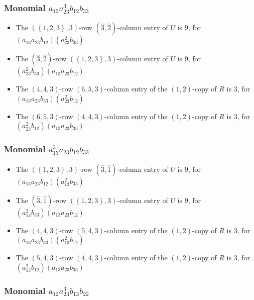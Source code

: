 \documentclass{article}
\begin{document}
\subsubsection{Monomial $ a_{13} a_{23}^{3} b_{12} b_{33} $}

\begin{itemize}
\item The $ \left(\left\{1, 2, 3\right\}, 3\right) $-row $ (\hat{3}, \hat{2}) $-column entry of $U$ is $ 9 $, for $( a_{13} a_{23} b_{12} )( a_{23}^{2} b_{33} )$ 
\item The $(\hat{3}, \hat{2})$-row $ \left(\left\{1, 2, 3\right\}, 3\right) $-column entry of $U$ is $ 9 $, for $( a_{23}^{2} b_{33} )( a_{13} a_{23} b_{12} )$ 
\item The $(4, 4, 3)$-row $(6, 5, 3)$-column entry of the $ \left(1, 2\right) $-copy of $R$ is $ 3 $, for $( a_{13} a_{23} b_{33} )( a_{23}^{2} b_{12} )$ 
\item The $(6, 5, 3)$-row $(4, 4, 3)$-column entry of the $ \left(1, 2\right) $-copy of $R$ is $ 3 $, for $( a_{23}^{2} b_{12} )( a_{13} a_{23} b_{33} )$ 
\end{itemize}
\subsubsection{Monomial $ a_{13}^{3} a_{23} b_{12} b_{33} $}

\begin{itemize}
\item The $ \left(\left\{1, 2, 3\right\}, 3\right) $-row $ (\hat{3}, \hat{1}) $-column entry of $U$ is $ 9 $, for $( a_{13} a_{23} b_{12} )( a_{13}^{2} b_{33} )$ 
\item The $(\hat{3}, \hat{1})$-row $ \left(\left\{1, 2, 3\right\}, 3\right) $-column entry of $U$ is $ 9 $, for $( a_{13}^{2} b_{33} )( a_{13} a_{23} b_{12} )$ 
\item The $(4, 4, 3)$-row $(5, 4, 3)$-column entry of the $ \left(1, 2\right) $-copy of $R$ is $ 3 $, for $( a_{13} a_{23} b_{33} )( a_{13}^{2} b_{12} )$ 
\item The $(5, 4, 3)$-row $(4, 4, 3)$-column entry of the $ \left(1, 2\right) $-copy of $R$ is $ 3 $, for $( a_{13}^{2} b_{12} )( a_{13} a_{23} b_{33} )$ 
\end{itemize}
\subsubsection{Monomial $ a_{12} a_{23}^{3} b_{13} b_{22} $}
\end{document}
